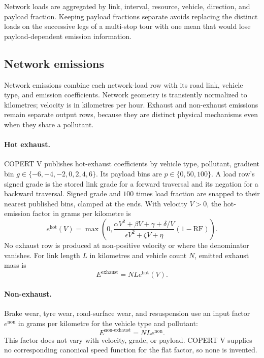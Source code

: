 Network loads are aggregated by link, interval, resource, vehicle, direction, and payload
fraction. Keeping payload fractions separate avoids replacing the distinct loads on the
successive legs of a multi-stop tour with one mean that would lose payload-dependent
emission information.

\subsection{Network emissions}

Network emissions combine each network-load row with its road link, vehicle type, and
emission coefficients. Network geometry is transiently normalized to kilometres; velocity
is in kilometres per hour. Exhaust and non-exhaust emissions remain separate output rows,
because they are distinct physical mechanisms even when they share a pollutant.

\paragraph{Hot exhaust.}
COPERT V publishes hot-exhaust coefficients by vehicle type, pollutant, gradient bin
$g \in \{-6,-4,-2,0,2,4,6\}$. Its payload bins are $p \in \{0,50,100\}$. A load row's
signed grade is the stored link grade for a forward traversal and its negation for a backward
traversal. Signed grade and $100$ times load fraction are snapped to their nearest
published bins, clamped at the ends. With velocity $V > 0$, the hot-emission factor in
grams per kilometre is
\begin{equation}
  e^{\mathrm{hot}}(V) =
  \max\left(
    0,
    \frac{\alpha V^2 + \beta V + \gamma + \delta/V}
         {\epsilon V^2 + \zeta V + \eta}
    (1-\mathrm{RF})
  \right).
\end{equation}
No exhaust row is produced at non-positive velocity or where the denominator vanishes.
For link length $L$ in kilometres and vehicle count $N$, emitted exhaust mass is
\begin{equation}
  E^{\mathrm{exhaust}} = N L e^{\mathrm{hot}}(V).
\end{equation}

\paragraph{Non-exhaust.}
Brake wear, tyre wear, road-surface wear, and resuspension use an input factor
$e^{\mathrm{non}}$ in grams per kilometre for the vehicle type and pollutant:
\begin{equation}
  E^{\mathrm{non\text{-}exhaust}} = N L e^{\mathrm{non}}.
\end{equation}
This factor does not vary with velocity, grade, or payload. COPERT V supplies no
corresponding canonical speed function for the flat factor, so none is invented.
